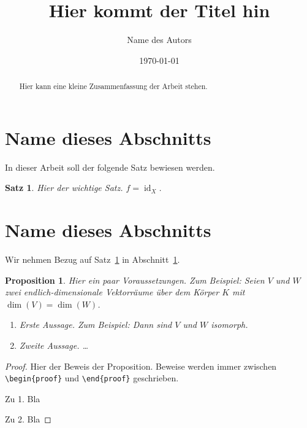 \documentclass[a4paper,11pt]{article}
\newcommand{\id}{\operatorname{id}}
\theoremstyle{definition}
\theoremstyle{plain}
\newtheorem{proposition}[equation]{Proposition}
\newtheorem{theorem}[equation]{Satz}
\begin{document}
\title{Hier kommt der Titel hin}
\author{Name des Autors}
\date{\today}

\maketitle


\begin{abstract}
   Hier kann eine kleine Zusammenfassung der Arbeit stehen.
\end{abstract}


\section{Name dieses Abschnitts}
\label{sectionx}

In dieser Arbeit soll der folgende Satz bewiesen werden.

\begin{theorem} \label{thm::bla} 
   Hier der wichtige Satz. $f = \id_X$.
\end{theorem}


\section{Name dieses Abschnitts}
\label{sectiony}

Wir nehmen Bezug auf Satz~\ref{thm::bla} in 
Abschnitt~\ref{sectionx}.

\begin{proposition} \label{prop1} 
   Hier ein paar Voraussetzungen. Zum Beispiel: Seien $V$ und $W$ zwei endlich-dimensionale Vektorräume über dem Körper $K$ mit $\dim(V) = \dim(W)$.
  \begin{enumerate}
  \item Erste Aussage. Zum Beispiel: Dann sind $V$ und $W$ isomorph.
  \item Zweite Aussage. \dots
  \end{enumerate}
\end{proposition}

\begin{proof}
  Hier der Beweis der Proposition. Beweise werden immer zwischen \verb!\begin{proof}! und 
  \verb!\end{proof}! geschrieben.
  
   Zu 1. Bla
   
   Zu 2. Bla
\end{proof}
\end{document}
